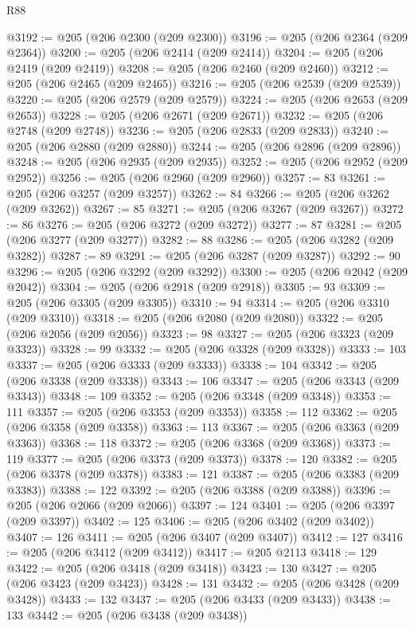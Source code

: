 \begin{lexlean}{R88}
\begin{coremodule}
@3192 := @205 (@206 @2300 (@209 @2300))
@3196 := @205 (@206 @2364 (@209 @2364))
@3200 := @205 (@206 @2414 (@209 @2414))
@3204 := @205 (@206 @2419 (@209 @2419))
@3208 := @205 (@206 @2460 (@209 @2460))
@3212 := @205 (@206 @2465 (@209 @2465))
@3216 := @205 (@206 @2539 (@209 @2539))
@3220 := @205 (@206 @2579 (@209 @2579))
@3224 := @205 (@206 @2653 (@209 @2653))
@3228 := @205 (@206 @2671 (@209 @2671))
@3232 := @205 (@206 @2748 (@209 @2748))
@3236 := @205 (@206 @2833 (@209 @2833))
@3240 := @205 (@206 @2880 (@209 @2880))
@3244 := @205 (@206 @2896 (@209 @2896))
@3248 := @205 (@206 @2935 (@209 @2935))
@3252 := @205 (@206 @2952 (@209 @2952))
@3256 := @205 (@206 @2960 (@209 @2960))
@3257 := 83
@3261 := @205 (@206 @3257 (@209 @3257))
@3262 := 84
@3266 := @205 (@206 @3262 (@209 @3262))
@3267 := 85
@3271 := @205 (@206 @3267 (@209 @3267))
@3272 := 86
@3276 := @205 (@206 @3272 (@209 @3272))
@3277 := 87
@3281 := @205 (@206 @3277 (@209 @3277))
@3282 := 88
@3286 := @205 (@206 @3282 (@209 @3282))
@3287 := 89
@3291 := @205 (@206 @3287 (@209 @3287))
@3292 := 90
@3296 := @205 (@206 @3292 (@209 @3292))
@3300 := @205 (@206 @2042 (@209 @2042))
@3304 := @205 (@206 @2918 (@209 @2918))
@3305 := 93
@3309 := @205 (@206 @3305 (@209 @3305))
@3310 := 94
@3314 := @205 (@206 @3310 (@209 @3310))
@3318 := @205 (@206 @2080 (@209 @2080))
@3322 := @205 (@206 @2056 (@209 @2056))
@3323 := 98
@3327 := @205 (@206 @3323 (@209 @3323))
@3328 := 99
@3332 := @205 (@206 @3328 (@209 @3328))
@3333 := 103
@3337 := @205 (@206 @3333 (@209 @3333))
@3338 := 104
@3342 := @205 (@206 @3338 (@209 @3338))
@3343 := 106
@3347 := @205 (@206 @3343 (@209 @3343))
@3348 := 109
@3352 := @205 (@206 @3348 (@209 @3348))
@3353 := 111
@3357 := @205 (@206 @3353 (@209 @3353))
@3358 := 112
@3362 := @205 (@206 @3358 (@209 @3358))
@3363 := 113
@3367 := @205 (@206 @3363 (@209 @3363))
@3368 := 118
@3372 := @205 (@206 @3368 (@209 @3368))
@3373 := 119
@3377 := @205 (@206 @3373 (@209 @3373))
@3378 := 120
@3382 := @205 (@206 @3378 (@209 @3378))
@3383 := 121
@3387 := @205 (@206 @3383 (@209 @3383))
@3388 := 122
@3392 := @205 (@206 @3388 (@209 @3388))
@3396 := @205 (@206 @2066 (@209 @2066))
@3397 := 124
@3401 := @205 (@206 @3397 (@209 @3397))
@3402 := 125
@3406 := @205 (@206 @3402 (@209 @3402))
@3407 := 126
@3411 := @205 (@206 @3407 (@209 @3407))
@3412 := 127
@3416 := @205 (@206 @3412 (@209 @3412))
@3417 := @205 @2113
@3418 := 129
@3422 := @205 (@206 @3418 (@209 @3418))
@3423 := 130
@3427 := @205 (@206 @3423 (@209 @3423))
@3428 := 131
@3432 := @205 (@206 @3428 (@209 @3428))
@3433 := 132
@3437 := @205 (@206 @3433 (@209 @3433))
@3438 := 133
@3442 := @205 (@206 @3438 (@209 @3438))

\end{coremodule}
\end{lexlean}
